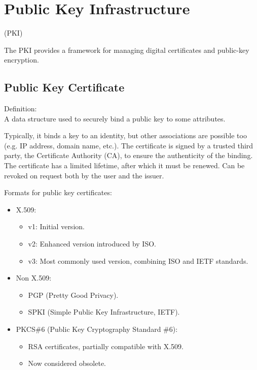\section{Public Key Infrastructure}
\begin{center}
    (PKI)
\end{center}
The PKI provides a framework for managing digital certificates and public-key encryption.

\subsection{Public Key Certificate}
\begin{center}
    Definition: \\ A data structure used to securely bind a public key to some attributes.
\end{center}

Typically, it binds a key to an identity, but other associations are possible too (e.g. IP address, domain name, etc.). The certificate is signed by a trusted third party, the Certificate Authority (CA), to ensure the authenticity of the binding. The certificate has a limited lifetime, after which it must be renewed. Can be revoked on request both by the user and the issuer.

\vspace{0.5cm}

Formats for public key certificates:
\begin{itemize}
\item X.509:
\begin{itemize}
\item v1: Initial version.
\item v2: Enhanced version introduced by ISO.
\item v3: Most commonly used version, combining ISO and IETF standards.
\end{itemize}
\item Non X.509:
\begin{itemize}
\item PGP (Pretty Good Privacy).
\item SPKI (Simple Public Key Infrastructure, IETF).
\end{itemize}
\item PKCS\#6 (Public Key Cryptography Standard \#6):
\begin{itemize}
\item RSA certificates, partially compatible with X.509.
\item Now considered obsolete.
\end{itemize}
\end{itemize}

